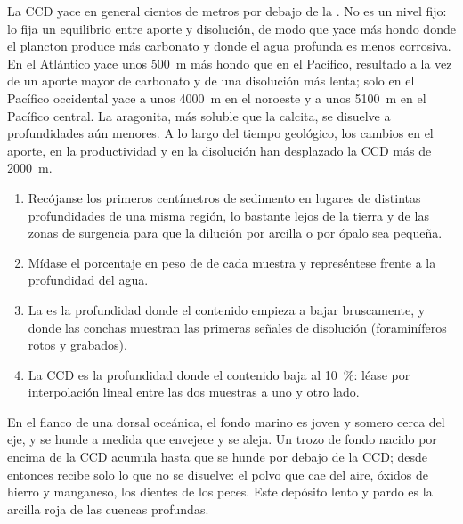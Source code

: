 La CCD yace en general cientos de metros por debajo de la . No es un nivel fijo: lo fija un equilibrio entre aporte y disolución, de modo que yace más hondo donde el plancton produce más
carbonato y donde el agua profunda es menos corrosiva. En el Atlántico yace unos \qty{500}{m} más hondo que en el Pacífico, resultado a la vez de un aporte mayor de carbonato y de una disolución más
lenta; solo en el Pacífico occidental yace a unos \qty{4000}{m} en el noroeste y a unos \qty{5100}{m} en el Pacífico central. La aragonita, más soluble que la calcita, se disuelve a profundidades aún
menores. A lo largo del tiempo geológico, los cambios en el aporte, en la productividad y en la disolución han desplazado la CCD más de \qty{2000}{m}.

\begin{method}\label{met:b1:chemical-biogenic-sediments:ccd}
\begin{enumerate}
  \item Recójanse los primeros centímetros de sedimento en lugares de distintas profundidades de una misma región, lo bastante lejos de la tierra y de las zonas de surgencia para que la dilución por arcilla o por ópalo sea pequeña.
  \item Mídase el porcentaje en peso de  de cada muestra y represéntese frente a la profundidad del agua.
  \item La  es la profundidad donde el contenido empieza a bajar bruscamente, y donde las conchas muestran las primeras señales de disolución (foraminíferos rotos y grabados).
  \item La CCD es la profundidad donde el contenido baja al \qty{10}{\%}: léase por interpolación lineal entre las dos muestras a uno y otro lado.
\end{enumerate}
\end{method}

En el flanco de una dorsal oceánica, el fondo marino es joven y somero cerca del eje, y se hunde a medida que envejece y se aleja. Un trozo de fondo nacido por encima de la CCD acumula  hasta que se hunde por debajo de la CCD; desde entonces recibe solo lo que no se disuelve: el polvo que cae del aire, óxidos de hierro y manganeso, los dientes de los peces. Este depósito
lento y pardo es la arcilla roja de las cuencas profundas.

